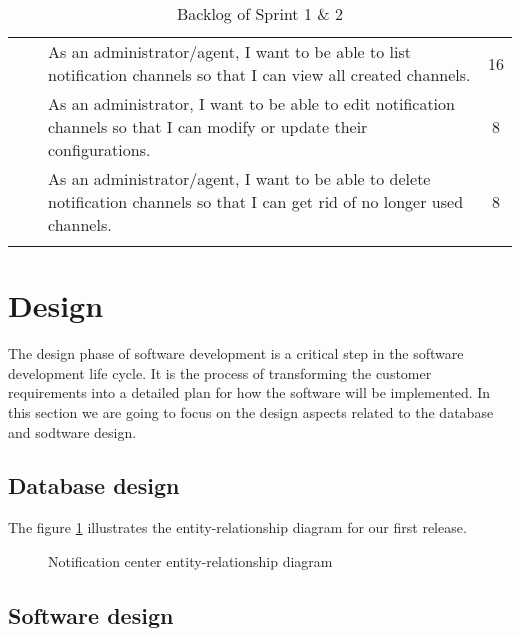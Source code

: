 \begin{longtable}{ | m{}  | m{} | m{} | c | }
    \cline{3-4}
                            &                                                     & As an administrator/agent, I want to be able to list notification channels so that I can view all created channels.                   & 16                  \\
    \cline{3-4}
                            &                                                     & As an administrator, I want to be able to edit notification channels so that I can modify or update their configurations.             & 8                   \\
    \cline{3-4}
                            &                                                     & As an administrator/agent, I want to be able to delete notification channels so that I can get rid of no longer used channels.        & 8                   \\
    \hline
    \caption{Backlog of Sprint 1 \& 2}
\end{longtable}

\section{Design}
The design phase of software development is a critical step in the software development life cycle.
It is the process of transforming the customer requirements into a detailed plan for how the software
will be implemented. In this section we are going to focus on the design aspects related to the database
and sodtware design.

\subsection{Database design}
The figure \ref{erd-diagram}  illustrates the entity-relationship diagram for our first release.

\begin{landscape}
    \begin{figure}[hbt!]
        \centering
        
        \caption{Notification center entity-relationship diagram}
        \label{erd-diagram}
    \end{figure}
\end{landscape}

\subsection{Software design}

